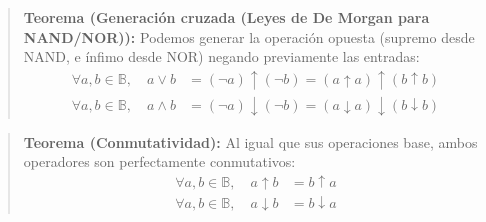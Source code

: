 \begin{quote}\textbf{Teorema (Generación cruzada (Leyes de De Morgan para NAND/NOR)):}\label{gen_cruzada}
Podemos generar la operación opuesta (supremo desde NAND, e ínfimo desde NOR) negando previamente las entradas:
\begin{align*}
    \forall a, b \in \mathbb{B}, \quad a \vee b &= (\neg a) \uparrow (\neg b) = (a \uparrow a) \uparrow (b \uparrow b) \\
    \forall a, b \in \mathbb{B}, \quad a \wedge b &= (\neg a) \downarrow (\neg b) = (a \downarrow a) \downarrow (b \downarrow b)
\end{align*}
\end{quote}

\begin{quote}\textbf{Teorema (Conmutatividad):}\label{conmut_deriv}
Al igual que sus operaciones base, ambos operadores son perfectamente conmutativos:
\begin{align*}
    \forall a, b \in \mathbb{B}, \quad a \uparrow b &= b \uparrow a \\
    \forall a, b \in \mathbb{B}, \quad a \downarrow b &= b \downarrow a
\end{align*}
\end{quote}

